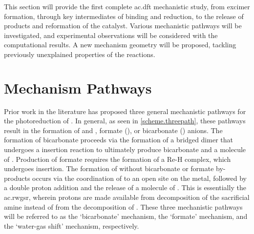 This section will provide the first complete \gls{ac.dft} mechanistic study, from excimer formation, through key intermediates of  binding and reduction, to the release of products and reformation of the catalyst. Various mechanistic pathways will be investigated, and experimental observations will be considered with the computational results. A new mechanism geometry will be proposed, tackling previously unexplained properties of the reactions.

\section{Mechanism Pathways}

Prior work in the literature has proposed three general mechanistic pathways for the photoreduction of \autocite{morris2009, hayashi2003, takeda2010, gibson2003}. In general, as seen in \autoref{scheme.threepath}, these pathways result in the formation of  and , formate (), or bicarbonate () anions. The formation of bicarbonate proceeds via the formation of a  bridged dimer that undergoes a  insertion reaction to ultimately produce bicarbonate and a molecule of . Production of formate requires the formation of a Re-H complex, which undergoes  insertion. The formation of  without bicarbonate or formate by-products occurs via the coordination of  to an open site on the metal, followed by a double proton addition and the release of a molecule of . This is essentially the \gls{ac.rwgsr}, wherein protons are made available from decomposition of the sacrificial amine instead of from the decomposition of \autocite{kalyanasundaram1978}. These three mechanistic pathways will be referred to as the `bicarbonate' mechanism, the `formate' mechanism, and the `water-gas shift' mechanism, respectively.

